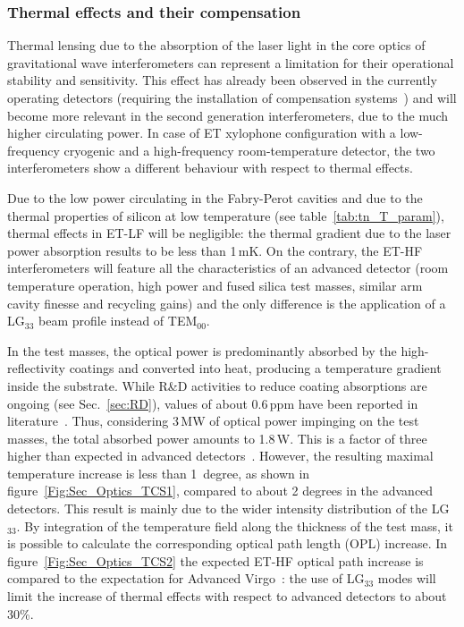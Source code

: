 \subsubsection{Thermal effects and their compensation}\label{sec:tcs}

Thermal lensing due to the absorption of the laser light in the core optics of gravitational wave interferometers can represent a  limitation for 
 their operational stability and sensitivity. This effect has already been observed in the currently operating
  detectors (requiring the installation of compensation systems~\cite{ligotcs,virgotcs,Accadia2010}) and 
  will become more relevant in the second generation interferometers, due to the much higher circulating power. 
In case of ET xylophone configuration with a low-frequency cryogenic and
 a high-frequency room-temperature detector, the two interferometers show a different behaviour with respect to thermal effects. 

Due to the low power circulating in the Fabry-Perot cavities  and due to the thermal properties of silicon 
at low temperature (see table~\ref{tab:tn_T_param}), thermal effects in ET-LF will be negligible: the thermal 
gradient due to the laser power absorption results to be less than 1\,mK. On the contrary, the ET-HF 
interferometers will feature all the characteristics of an advanced detector (room temperature operation, 
high power and fused silica test masses, similar arm cavity finesse and recycling gains) and the only difference is
 the application of a LG$_{33}$ beam profile instead of TEM$_{00}$. 

In the test masses, the optical power is predominantly absorbed by the high-reflectivity 
coatings and converted into heat, producing a temperature gradient 
inside the substrate. While R\&D activities to reduce coating absorptions are ongoing (see Sec.~\ref{sec:RD}), 
values of about 0.6\,ppm have been reported in literature~\cite{pin09}. Thus, considering 3\,MW of optical 
power impinging on the test masses, the total absorbed power amounts to 1.8\,W. This is a factor of three higher than expected 
in advanced detectors~\cite{fafo08}. However, the resulting maximal temperature increase is less than 
1~degree, as shown in figure~\ref{Fig:Sec_Optics_TCS1}, compared to about 2 degrees in the advanced detectors.
 This result is mainly due to the wider intensity distribution of the LG$_{33}$.
 By integration of the temperature field along the thickness of the test mass, it is possible to calculate the
  corresponding optical path length (OPL) increase. In figure~\ref{Fig:Sec_Optics_TCS2} the expected ET-HF
   optical path increase is compared to the expectation for Advanced Virgo~\cite{fafo08}: the use of LG$_{33}$ 
   modes will limit the increase of thermal effects with respect to advanced detectors to about 30\%.

